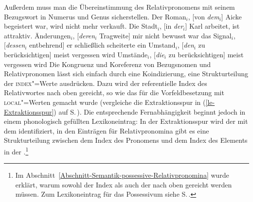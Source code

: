 Außerdem muss man die Übereinstimmung des Relativpronomens mit seinem Bezugswort in Numerus und Genus sicherstellen.
\eal
\ex Der Roman$_i$, [von \emph{dem}$_i$] Aicke begeistert war, wird nicht mehr verkauft.
\ex Die Stadt$_i$, [in \emph{der}$_i$] Karl arbeitet, ist attraktiv.
\ex Änderungen$_i$, [\emph{deren}$_i$ Tragweite] mir nicht bewusst war
\ex das Signal$_i$, [\emph{dessen}$_i$ entbehrend] er schließlich scheiterte
\ex ein Umstand$_i$, [\emph{den}$_i$ zu berücksichtigen] meist vergessen wird
\ex Umstände$_i$, [\emph{die}$_i$ zu berücksichtigen] meist vergessen wird
\zl
Die Kongruenz und Koreferenz von Bezugsnomen und Relativpronomen lässt sich einfach durch eine Koindizierung, 
eine Strukturteilung der \textsc{index}"=Werte ausdrücken. Dazu wird der referentielle Index
des Relativwortes nach oben gereicht, so wie das für die Vorfeldbesetzung mit
\textsc{local}"=Werten gemacht wurde (vergleiche die Extraktionsspur in (\ref{le-Extraktionsspur}) auf S.\,\pageref{le-Extraktionsspur}).
Die entsprechende Fernabhängigkeit beginnt jedoch in einem phonologisch gefüllten Lexikoneintrag:
\ea{}
\z
In der Extraktionsspur wird der \localw mit dem \slashel identifiziert,
in den Einträgen für Relativpronomina gibt es eine Strukturteilung zwischen dem Index des Pronomens
und dem Index des Elements in der \rell.\footnote{%
  Im Abschnitt~\ref{Abschnitt-Semantik-possessive-Relativpronomina} wurde erklärt, warum sowohl der
  Index als auch der \ltopw nach oben gereicht werden müssen. Zum Lexikoneintrag für das Possessivum
  siehe S.\,\pageref{le-dessen}.
}

